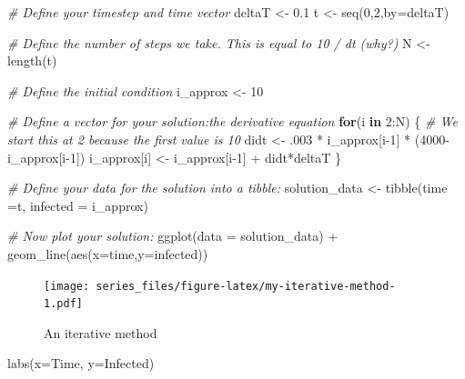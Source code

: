 \documentclass[
]{book}
\newenvironment{Shaded}{\begin{snugshade}}{\end{snugshade}}
\newcommand{\AttributeTok}[1]{\textcolor[rgb]{0.77,0.63,0.00}{#1}}
\newcommand{\CommentTok}[1]{\textcolor[rgb]{0.56,0.35,0.01}{\textit{#1}}}
\newcommand{\ControlFlowTok}[1]{\textcolor[rgb]{0.13,0.29,0.53}{\textbf{#1}}}
\newcommand{\DecValTok}[1]{\textcolor[rgb]{0.00,0.00,0.81}{#1}}
\newcommand{\FloatTok}[1]{\textcolor[rgb]{0.00,0.00,0.81}{#1}}
\newcommand{\FunctionTok}[1]{\textcolor[rgb]{0.00,0.00,0.00}{#1}}
\newcommand{\NormalTok}[1]{#1}
\newcommand{\OtherTok}[1]{\textcolor[rgb]{0.56,0.35,0.01}{#1}}
\newcommand{\SpecialCharTok}[1]{\textcolor[rgb]{0.00,0.00,0.00}{#1}}
\newcommand{\StringTok}[1]{\textcolor[rgb]{0.31,0.60,0.02}{#1}}
\theoremstyle{definition}
\theoremstyle{definition}
\theoremstyle{definition}
\theoremstyle{remark}
\begin{document}
\begin{Shaded}
\begin{Highlighting}[]
\CommentTok{\# Define your timestep and time vector}
\NormalTok{deltaT }\OtherTok{\textless{}{-}} \FloatTok{0.1}
\NormalTok{t }\OtherTok{\textless{}{-}} \FunctionTok{seq}\NormalTok{(}\DecValTok{0}\NormalTok{,}\DecValTok{2}\NormalTok{,}\AttributeTok{by=}\NormalTok{deltaT)}

\CommentTok{\# Define the number of steps we take.  This is equal to 10 / dt (why?)}
\NormalTok{N }\OtherTok{\textless{}{-}} \FunctionTok{length}\NormalTok{(t)}

\CommentTok{\# Define the initial condition}
\NormalTok{i\_approx }\OtherTok{\textless{}{-}} \DecValTok{10}

\CommentTok{\# Define a vector for your solution:the derivative equation}
\ControlFlowTok{for}\NormalTok{(i }\ControlFlowTok{in} \DecValTok{2}\SpecialCharTok{:}\NormalTok{N) \{  }\CommentTok{\# We start this at 2 because the first value is 10}
\NormalTok{  didt }\OtherTok{\textless{}{-}}\NormalTok{ .}\DecValTok{003} \SpecialCharTok{*}\NormalTok{ i\_approx[i}\DecValTok{{-}1}\NormalTok{] }\SpecialCharTok{*}\NormalTok{ (}\DecValTok{4000}\SpecialCharTok{{-}}\NormalTok{i\_approx[i}\DecValTok{{-}1}\NormalTok{])}
\NormalTok{  i\_approx[i] }\OtherTok{\textless{}{-}}\NormalTok{ i\_approx[i}\DecValTok{{-}1}\NormalTok{] }\SpecialCharTok{+}\NormalTok{ didt}\SpecialCharTok{*}\NormalTok{deltaT}
\NormalTok{\}}


\CommentTok{\# Define your data for the solution into a tibble:}
\NormalTok{solution\_data }\OtherTok{\textless{}{-}} \FunctionTok{tibble}\NormalTok{(}\AttributeTok{time =}\NormalTok{t,}
                        \AttributeTok{infected =}\NormalTok{ i\_approx)}

\CommentTok{\# Now plot your solution:}
\FunctionTok{ggplot}\NormalTok{(}\AttributeTok{data =}\NormalTok{ solution\_data) }\SpecialCharTok{+}
  \FunctionTok{geom\_line}\NormalTok{(}\FunctionTok{aes}\NormalTok{(}\AttributeTok{x=}\NormalTok{time,}\AttributeTok{y=}\NormalTok{infected)) }
\end{Highlighting}
\end{Shaded}

\begin{figure}
\centering
\texttt{[image: series\_files/figure-latex/my-iterative-method-1.pdf]}
\caption{\label{fig:my-iterative-method}An iterative method}
\end{figure}

\begin{Shaded}
\begin{Highlighting}[]
  \FunctionTok{labs}\NormalTok{(}\AttributeTok{x=}\StringTok{\textquotesingle{}Time\textquotesingle{}}\NormalTok{,}
         \AttributeTok{y=}\StringTok{\textquotesingle{}Infected\textquotesingle{}}\NormalTok{)}
\end{Highlighting}
\end{Shaded}
\end{document}
